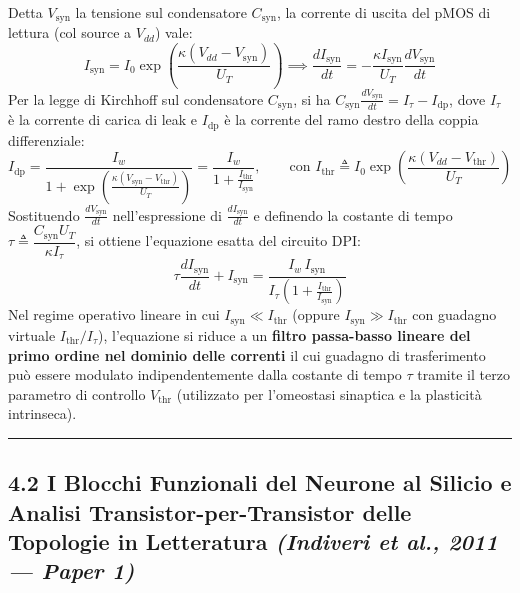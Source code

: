 \documentclass[11pt,a4paper]{article}
\begin{document}
Detta $V_{\text{syn}}$ la tensione sul condensatore $C_{\text{syn}}$, la corrente di uscita del pMOS di lettura (col source a $V_{dd}$) vale:
\[
I_{\text{syn}} = I_0 \exp\left(\frac{\kappa (V_{dd} - V_{\text{syn}})}{U_T}\right) \implies \frac{dI_{\text{syn}}}{dt} = -\frac{\kappa I_{\text{syn}}}{U_T} \frac{dV_{\text{syn}}}{dt}
\]
Per la legge di Kirchhoff sul condensatore $C_{\text{syn}}$, si ha $C_{\text{syn}} \frac{dV_{\text{syn}}}{dt} = I_\tau - I_{\text{dp}}$, dove $I_\tau$ è la corrente di carica di leak e $I_{\text{dp}}$ è la corrente del ramo destro della coppia differenziale:
\[
I_{\text{dp}} = \frac{I_w}{1 + \exp\left(\frac{\kappa (V_{\text{syn}} - V_{\text{thr}})}{U_T}\right)} = \frac{I_w}{1 + \frac{I_{\text{thr}}}{I_{\text{syn}}}}, \qquad \text{con } I_{\text{thr}} \triangleq I_0 \exp\left(\frac{\kappa (V_{dd} - V_{\text{thr}})}{U_T}\right)
\]
Sostituendo $\frac{dV_{\text{syn}}}{dt}$ nell'espressione di $\frac{dI_{\text{syn}}}{dt}$ e definendo la costante di tempo \textbf{$\tau \triangleq \dfrac{C_{\text{syn}} U_T}{\kappa I_\tau}$}, si ottiene l'equazione esatta del circuito DPI:
\[
\tau \frac{dI_{\text{syn}}}{dt} + I_{\text{syn}} = \frac{I_w \, I_{\text{syn}}}{I_\tau \left(1 + \frac{I_{\text{thr}}}{I_{\text{syn}}}\right)}
\]
Nel regime operativo lineare in cui $I_{\text{syn}} \ll I_{\text{thr}}$ (oppure $I_{\text{syn}} \gg I_{\text{thr}}$ con guadagno virtuale $I_{\text{thr}}/I_\tau$), l'equazione si riduce a un \textbf{filtro passa-basso lineare del primo ordine nel dominio delle correnti} il cui guadagno di trasferimento può essere modulato indipendentemente dalla costante di tempo $\tau$ tramite il terzo parametro di controllo \textbf{$V_{\text{thr}}$} (utilizzato per l'omeostasi sinaptica e la plasticità intrinseca).

\bigskip\hrule\bigskip

\subsection{4.2 I Blocchi Funzionali del Neurone al Silicio e Analisi Transistor-per-Transistor delle Topologie in Letteratura \textit{(Indiveri et al., 2011 --- Paper 1)}}
\end{document}
